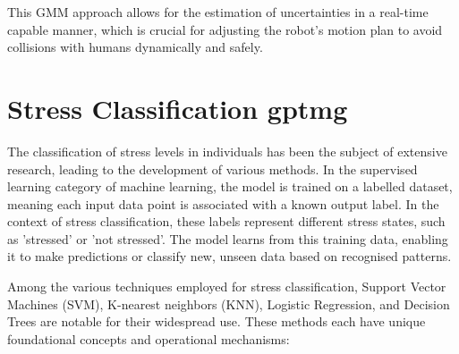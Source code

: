 This GMM approach allows for the estimation of uncertainties in a real-time capable manner, which is crucial for adjusting the robot's motion plan to avoid collisions with humans dynamically and safely.


\section{Stress Classification \gls{gptmg}}
The classification of stress levels in individuals has been the subject of extensive research, leading to the development of various methods. In the supervised learning category of machine learning, the model is trained on a labelled dataset, meaning each input data point is associated with a known output label. In the context of stress classification, these labels represent different stress states, such as 'stressed' or 'not stressed'. The model learns from this training data, enabling it to make predictions or classify new, unseen data based on recognised patterns.

Among the various techniques employed for stress classification, Support Vector Machines (SVM), K-nearest neighbors (KNN), Logistic Regression, and Decision Trees are notable for their widespread use. These methods each have unique foundational concepts and operational mechanisms:

